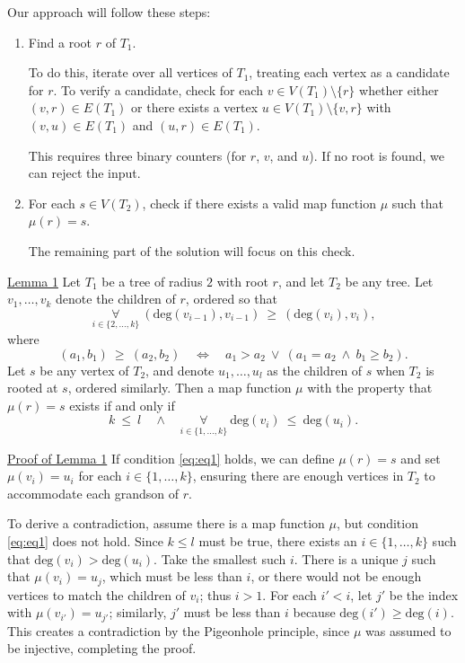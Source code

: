 \documentclass[12pt]{article}
\begin{document}
	Our approach will follow these steps:
	\begin{enumerate}
		\item Find a root \(r\) of \(T_{1}\).
		      
		      To do this, iterate over all vertices of \(T_{1}\), treating each
		      vertex as a candidate for \(r\). To verify a candidate, check for
		      each \(v \in V(T_{1}) \setminus \{r\}\) whether either \((v, r)
		      \in E(T_{1})\) or there exists a vertex \(u \in V(T_{1}) \setminus
		      \{v, r\}\) with \((v, u) \in E(T_{1})\) and \((u, r) \in
		      E(T_{1})\).
		      
		      This requires three binary counters (for \(r\), \(v\), and \(u\)).
		      If no root is found, we can reject the input.
		
		\item For each \(s \in V(T_{2})\), check if there exists a valid map
		      function \(\mu\) such that \(\mu(r) = s\).
		      
		      The remaining part of the solution will focus on this check.
	\end{enumerate}
	
	\underline{Lemma 1} Let \(T_{1}\) be a tree of radius \(2\) with root \(r\),
	and let \(T_{2}\) be any tree. Let \(v_{1}, \ldots, v_{k}\) denote the
	children of \(r\), ordered so that
	\[ \underset{i \in \{2, \ldots, k\}}{\forall} \ (\text{deg}(v_{i - 1}),
	v_{i - 1}) \ \geqslant \ (\text{deg}(v_{i}), v_{i}) \text{,} \]
	where
	\[ (a_{1}, b_{1}) \ \geqslant \ (a_{2}, b_{2}) \quad \iff \quad a_{1} >
	a_{2} \ \vee \ (a_{1} = a_{2} \ \wedge \ b_{1} \geqslant b_{2}) \text{.} \]
	Let \(s\) be any vertex of \(T_{2}\), and denote \(u_{1}, \ldots, u_{l}\)
	as the children of \(s\) when \(T_{2}\) is rooted at \(s\), ordered
	similarly. Then a map function \(\mu\) with the property that \(\mu(r) = s\)
	exists if and only if
	\begin{equation} \label{eq:eq1}
		k \ \leqslant \ l \quad \wedge \quad \underset{i \in \{1, \ldots, k\}}
		{\forall} \ \text{deg}(v_{i}) \ \leqslant \ \text{deg}(u_{i}) \text{.}
	\end{equation}
	
	\underline{Proof of Lemma 1} If condition \ref{eq:eq1} holds, we can define
	\(\mu(r) = s\) and set \(\mu(v_{i}) = u_{i}\) for each \(i \in \{1, \ldots,
	k\}\), ensuring there are enough vertices in \(T_{2}\) to accommodate each
	grandson of \(r\).
	
	\medskip
	
	To derive a contradiction, assume there is a map function \(\mu\), but
	condition \ref{eq:eq1} does not hold. Since \(k \leqslant l\) must be true,
	there exists an \(i \in \{1, \ldots, k\}\) such that \(\text{deg}(v_{i}) >
	\text{deg}(u_{i})\). Take the smallest such \(i\). There is a unique \(j\)
	such that \(\mu(v_{i}) = u_{j}\), which must be less than \(i\), or there
	would not be enough vertices to match the children of \(v_{i}\); thus \(i >
	1\). For each \(i' < i\), let \(j'\) be the index with \(\mu(v_{i'}) =
	u_{j'}\); similarly, \(j'\) must be less than \(i\) because \(\text{deg}(i')
	\geqslant \text{deg}(i)\). This creates a contradiction by the Pigeonhole
	principle, since \(\mu\) was assumed to be injective, completing the proof.
	
\end{document}
